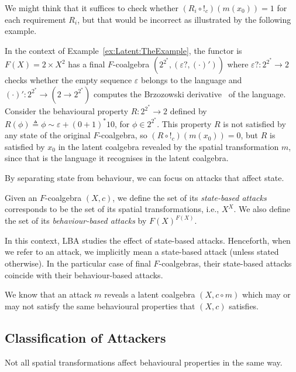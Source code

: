We might think that it suffices to check whether $(R_i\circ !_c)(m(x_0))=1$ for each requirement $R_i$, but that would be incorrect as illustrated by the following example.
\begin{example}
    In the context of Example~\ref{ex:Latent:TheExample}, the functor is $F(X)=2\times X^2$ has a final $F$-coalgebra $(2^{2^*},(\varepsilon?,(\cdot)'))$ where $\varepsilon? \colon 2^{2^*}\rightarrow 2$ checks whether the empty sequence $\varepsilon$ belongs to the language and $(\cdot)'\colon 2^{2^*}\rightarrow (2\rightarrow {2^{2^*}})$ computes the Brzozowski derivative~\cite{BrzozowskiDerivative} of the language.  
    Consider the behavioural property $R\colon 2^{2^*}\rightarrow 2$ defined by $R(\phi)\triangleq \phi \sim \varepsilon+(0+1)^*10$, for $\phi \in 2^{2^*}$. This property $R$ is not satisfied by any state of the original $F$-coalgebra, so $(R\circ !_c)(m(x_0))=0$, but $R$ is satisfied by $x_0$ in the latent coalgebra revealed by the spatial transformation $m$, since that is the language it recognises in the latent coalgebra. 
\end{example}

By separating state from behaviour, we can focus on attacks that affect state. 
\begin{definition}[Attacks]
    Given an $F$-coalgebra $(X,c)$, we define the set of its \emph{state-based attacks} corresponds to be the set of its spatial transformations, i.e., $X^X$. 
    We also define the set of its \emph{behaviour-based attacks} by $F(X)^{F(X)}$. 
    \end{definition}
In this context, LBA studies the effect of state-based attacks. Henceforth, when we refer to an attack, we implicitly mean a state-based attack (unless stated otherwise). In the particular case of final $F$-coalgebras, their state-based attacks coincide with their behaviour-based attacks. 

We know that an attack $m$ reveals a latent coalgebra $(X, c\circ m)$ which may or may not satisfy the same behavioural properties that $(X, c)$ satisfies. 


\subsection{Classification of Attackers}
Not all spatial transformations affect behavioural properties in the same way. 


